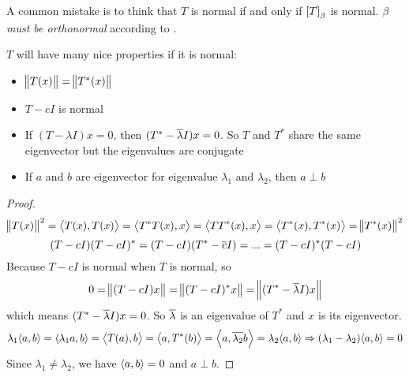 A common mistake is to think that $T$ is normal if and only if $\coordinate{T}_\beta$ is normal. \emph{$\beta$ must be orthonormal} according to .

\begin{theorem}
    $T$ will have many nice properties if it is normal:
\begin{itemize}
    \item $\norm{T(x)} = \norm{T^* (x)}$
    \item $T - cI$ is normal
    \item If $(T - \lambda I)x = 0$, then $(T^* - \overline{\lambda}I)x = 0$. So $T$ and $T^*$ share the same eigenvector but the eigenvalues are conjugate
    \item If $a$ and $b$ are eigenvector for eigenvalue $\lambda_1$ and $\lambda_2$, then $a \perp b$\label{normal_eigenvectors_are_orthogonal}
\end{itemize}
\end{theorem}
\begin{proof}
    \begin{equation*}
        \norm{T(x)}^2 = \innerproduct{T(x)}{T(x)} = \innerproduct{T^*T(x)}{x} = \innerproduct{TT^*(x)}{x} = \innerproduct{T^*(x)}{T^*(x)} = \norm{T^*(x)}^2
    \end{equation*}
    \begin{equation*}
        (T-cI)(T-cI)^* = (T-cI)(T^* - \overline{c}I) = ... = (T-cI)^*(T-cI)
    \end{equation*}
    Because $T-cI$ is normal when $T$ is normal, so
    \begin{equation*}
        0 = \norm{(T-cI)x} = \norm{(T-cI)^* x} =  \norm{(T^*- \overline{\lambda} I)x}
    \end{equation*}
    which means $(T^*- \overline{\lambda} I)x = 0$. So $\overline{\lambda}$ is an eigenvalue of $T^*$ and $x$ is its eigenvector.
    \begin{equation*}
        \lambda_1 \innerproduct{a}{b} = \innerproduct{\lambda_1 a}{b} = \innerproduct{T(a)}{b} = \innerproduct{a}{T^*(b)} = \innerproduct{a}{\conjugate{\lambda_2}b} = \lambda_2 \innerproduct{a}{b} \Rightarrow (\lambda_1 - \lambda_2)\innerproduct{a}{b} = 0
    \end{equation*}
    Since $\lambda_1 \neq \lambda_2$, we have $\innerproduct{a}{b} = 0$ and $a \perp b$.
\end{proof}


